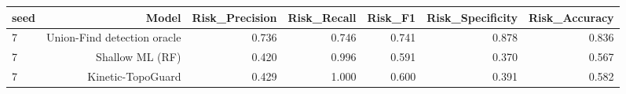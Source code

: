 \begin{tabular}{lrrrrrr}
\toprule
seed & Model & Risk\_Precision & Risk\_Recall & Risk\_F1 & Risk\_Specificity & Risk\_Accuracy \\
\midrule
7 & Union-Find detection oracle & 0.736 & 0.746 & 0.741 & 0.878 & 0.836 \\
7 & Shallow ML (RF) & 0.420 & 0.996 & 0.591 & 0.370 & 0.567 \\
7 & Kinetic-TopoGuard & 0.429 & 1.000 & 0.600 & 0.391 & 0.582 \\
\bottomrule
\end{tabular}